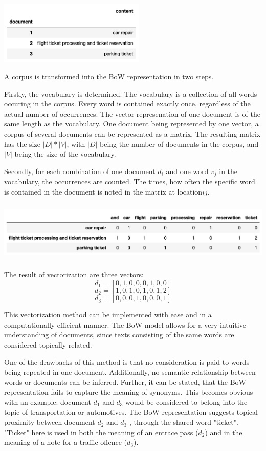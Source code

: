             \includegraphics[height=3cm]{Bilder/corpus_bow.png}
            
            A corpus is transformed into the \ac{BoW} representation in two steps. 
            
            Firstly, the vocabulary is determined. 
            The vocabulary is a collection of all words occuring in the corpus. Every word is contained exactly once, regardless of the actual number of occurrences. The vector represenation of one document is of the same length as the vocabulary. One document being represented by one vector, a corpus of several documents can be represented as a matrix. The resulting matrix has the size $ |D|*|V| $, with $|D|$ being the number of documents in the corpus, and $|V|$ being the size of the vocabulary.
            
            Secondly, for each combination of one document $ d_{i} $ and one word $ v_{j} $ in the vocabulary, the occurrences are counted. The times, how often the specific word is contained in the document is noted in the matrix at location$  ij $.
            
            \includegraphics[height=2.9cm]{Bilder/bow.png}
    
            The result of vectorization are three vectors:
            \[ d_{1} = [0,1,0,0,0,1,0,0] \]
            \[ d_{2} = [1,0,1,0,1,0,1,2] \]	
            \[ d_{3} = [0,0,0,1,0,0,0,1]\]
    
    
            This vectorization method can be implemented with ease and in a computationally efficient manner. The \ac{BoW} model allows for a very intuitive understanding of documents, since texts consisting of the same words are considered topically related. 
            
            One of the drawbacks of this method is that no consideration is paid to words being repeated in one document. Additionally, no semantic relationship between words or documents can be inferred. 
            Further, it can be stated, that the \ac{BoW} representation fails to capture the meaning of synonyms. This becomes obvious with an example: document $ d_{1} $ and $ d_{3}$ would be considered to belong into the topic of transportation or automotives. The \ac{BoW} representation suggests topical proximity between document $ d_{2} $ and $ d_{3}$ , through the shared word "ticket". "Ticket" here is used in both the meaning of an entrace pass ($d_{2}$) and in the meaning of a note for a traffic offence  ($d_{3}$). 
            
